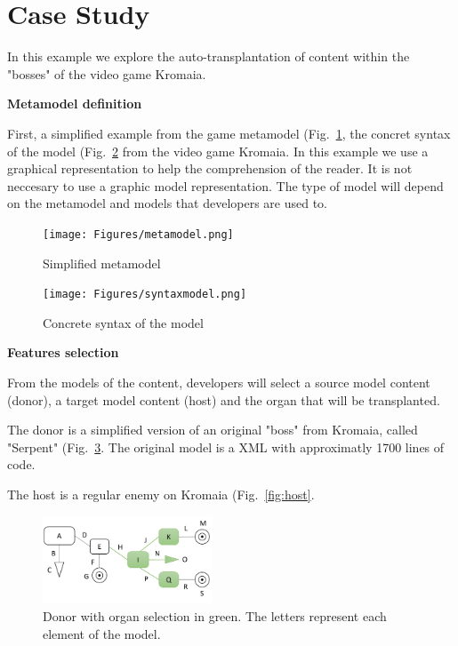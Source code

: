 \section{Case Study}

In this example we explore the auto-transplantation of content within the "bosses" of the video game Kromaia.

\textbf{Metamodel definition}

First, a simplified example from the game metamodel (Fig.~\ref{fig:metamodel}, the concret syntax of the model (Fig.~\ref{fig:syntax} from the video game Kromaia. In this example we use a graphical representation to help the comprehension of the reader. It is not neccesary to use a graphic model representation. The type of model will depend on the metamodel and models that developers are used to.


\begin{figure}[h]
    \centering
    \texttt{[image: Figures/metamodel.png]}
    \caption{Simplified metamodel}
    \label{fig:metamodel}
\end{figure}

\begin{figure}[h]
    \centering
    \texttt{[image: Figures/syntaxmodel.png]}
    \caption{Concrete syntax of the model}
    \label{fig:syntax}
\end{figure}

\textbf{Features selection}

From the models of the content, developers will select a source model content (donor), a target model content (host) and the organ that will be transplanted. 

The donor is a simplified version of an original "boss" from Kromaia, called "Serpent" (Fig.~\ref{fig:donor}. The original model is a XML with approximatly 1700 lines of code.

The host is a regular enemy on Kromaia (Fig.~\ref{fig:host}.

\begin{figure}[h]
    \centering
    \includegraphics[width=0.45\textwidth]{Figures/donor+organ.png}
    \caption{Donor with organ selection in green. The letters represent each element of the model.}
    \label{fig:donor}
\end{figure}

